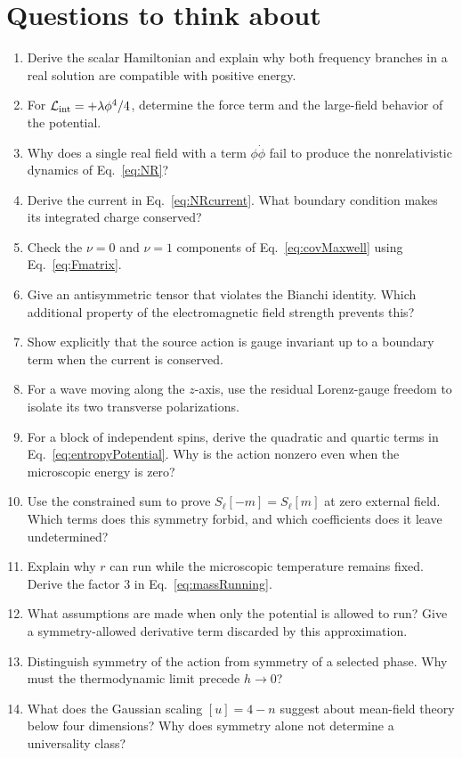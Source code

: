 \documentclass[11pt]{article}
\newcommand{\Lag}{\mathcal{L}}
\begin{document}
\section{Questions to think about}
\begin{enumerate}
\item Derive the scalar Hamiltonian and explain why both frequency branches
in a real solution are compatible with positive energy.
\item For \(\Lag_{\rm int}=+\lambda\phi^4/4\), determine the force term and
the large-field behavior of the potential.
\item Why does a single real field with a term \(\phi\dot\phi\) fail to
produce the nonrelativistic dynamics of Eq.~\eqref{eq:NR}?
\item Derive the current in Eq.~\eqref{eq:NRcurrent}. What boundary condition
makes its integrated charge conserved?
\item Check the \(\nu=0\) and \(\nu=1\) components of
Eq.~\eqref{eq:covMaxwell} using Eq.~\eqref{eq:Fmatrix}.
\item Give an antisymmetric tensor that violates the Bianchi identity.
Which additional property of the electromagnetic field strength prevents
this?
\item Show explicitly that the source action is gauge invariant up to a
boundary term when the current is conserved.
\item For a wave moving along the \(z\)-axis, use the residual Lorenz-gauge
freedom to isolate its two transverse polarizations.
\item For a block of independent spins, derive the quadratic and quartic
terms in Eq.~\eqref{eq:entropyPotential}. Why is the action nonzero even
when the microscopic energy is zero?
\item Use the constrained sum to prove \(S_\ell[-m]=S_\ell[m]\) at zero
external field. Which terms does this symmetry forbid, and which
coefficients does it leave undetermined?
\item Explain why \(r\) can run while the microscopic temperature remains
fixed. Derive the factor \(3\) in Eq.~\eqref{eq:massRunning}.
\item What assumptions are made when only the potential is allowed to run?
Give a symmetry-allowed derivative term discarded by this approximation.
\item Distinguish symmetry of the action from symmetry of a selected
phase. Why must the thermodynamic limit precede \(h\to0\)?
\item What does the Gaussian scaling \([u]=4-n\) suggest about mean-field
theory below four dimensions? Why does symmetry alone not determine a
universality class?
\end{enumerate}
\end{document}

